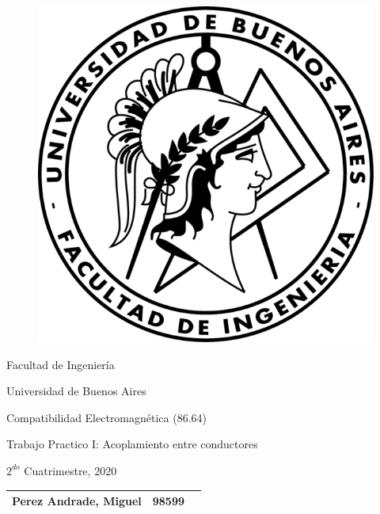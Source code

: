 \vspace*{0.10in}


\begin{figure}[htp]
				\begin{center}
					\includegraphics[scale=0.7]{imagenes/fiuba.png} 
				\end{center}
			\end{figure} 
            
\begin{center}
	\Huge{Facultad de Ingeniería}\\
    		\vspace{1.5mm}

	\Huge{Universidad de Buenos Aires}
    
    		\vspace{1.5mm}

    
                \huge{Compatibilidad Electromagnética (86.64)}
	
		\vspace{3mm}

\LARGE{Trabajo Practico I: Acoplamiento entre conductores}

\vspace{3mm}

\Large $2^{do}$ Cuatrimestre, 2020 \\
\vspace{3mm}

\begin{tabular}{l c r}
\hline
\hline
\large{Perez Andrade, Miguel} & \hspace{10mm}98599 & \hspace{10mm}{mandrade@fi.uba.ar} \\
\hline
\hline
\end{tabular}


\end{center}
